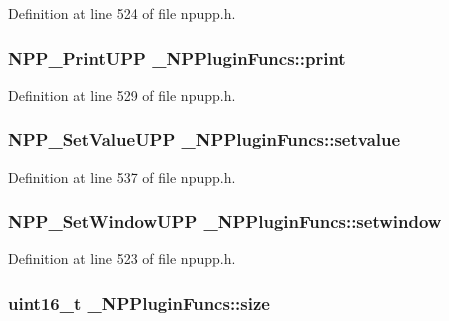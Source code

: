 Definition at line 524 of file npupp.h.

\hypertarget{struct___n_p_plugin_funcs_a61315ce968aa63b51556f77583e2d5a3}{
\subsubsection[{print}]{\setlength{\rightskip}{0pt plus 5cm}NPP\_\-PrintUPP {\bf \_\-NPPluginFuncs::print}}}
\label{struct___n_p_plugin_funcs_a61315ce968aa63b51556f77583e2d5a3}


Definition at line 529 of file npupp.h.

\hypertarget{struct___n_p_plugin_funcs_a614987720847ebc92393044fbfe88994}{
\subsubsection[{setvalue}]{\setlength{\rightskip}{0pt plus 5cm}NPP\_\-SetValueUPP {\bf \_\-NPPluginFuncs::setvalue}}}
\label{struct___n_p_plugin_funcs_a614987720847ebc92393044fbfe88994}


Definition at line 537 of file npupp.h.

\hypertarget{struct___n_p_plugin_funcs_a6dd430e8402ff3904d58926dcb9b9243}{
\subsubsection[{setwindow}]{\setlength{\rightskip}{0pt plus 5cm}NPP\_\-SetWindowUPP {\bf \_\-NPPluginFuncs::setwindow}}}
\label{struct___n_p_plugin_funcs_a6dd430e8402ff3904d58926dcb9b9243}


Definition at line 523 of file npupp.h.

\hypertarget{struct___n_p_plugin_funcs_ae56a05ff9615e602eeb6d750417b45ab}{
\subsubsection[{size}]{\setlength{\rightskip}{0pt plus 5cm}uint16\_\-t {\bf \_\-NPPluginFuncs::size}}}
\label{struct___n_p_plugin_funcs_ae56a05ff9615e602eeb6d750417b45ab}


